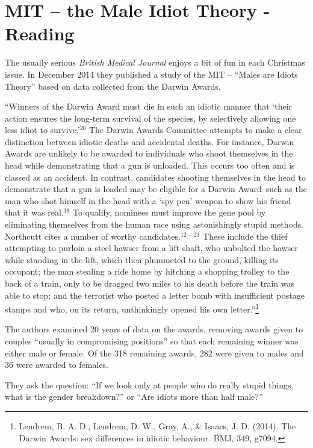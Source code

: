 \def\theTopic{Reading 7}


\section{ MIT -- the Male Idiot Theory - Reading}


The usually  serious {\em British Medical Journal} enjoys a bit
of fun in each Christmas issue.  In December 2014 they
published a study of the MIT -- ``Males are Idiots Theory'' based on
data collected from the Darwin Awards.

``Winners of the Darwin Award must die in such an idiotic
manner that `their action ensures the long-term survival of the
species, by selectively allowing one less idiot to survive.'$^{20}$ The
Darwin Awards Committee attempts to make a clear distinction
between idiotic deaths and accidental deaths. For instance,
Darwin Awards are unlikely to be awarded to individuals who
shoot themselves in the head while demonstrating that a gun is
unloaded. This occurs too often and is classed as an accident.
In contrast, candidates shooting themselves in the head to
demonstrate that a gun is loaded may be eligible for a Darwin
Award--such as the man who shot himself in the head with a
`spy pen' weapon to show his friend that it was real.$^{18}$
To qualify, nominees must improve the gene pool by eliminating
themselves from the human race using astonishingly stupid
methods. Northcutt cites a number of worthy candidates.$^{12-21}$
These include the thief attempting to purloin a steel hawser from
a lift shaft, who unbolted the hawser while standing in the lift,
which then plummeted to the ground, killing its occupant; the
man stealing a ride home by hitching a shopping trolley to the
back of a train, only to be dragged two miles to his death before
the train was able to stop; and the terrorist who posted a letter
bomb with insufficient postage stamps and who, on its return,
unthinkingly opened his own letter.''\footnote{Lendrem, B. A. D.,
  Lendrem, D. W., Gray, A., \& Isaacs, J. D. (2014). The Darwin
  Awards: sex differences in idiotic behaviour. BMJ, 349, g7094.} 

The authors examined 20 years of data on the awards, removing awards
given to couples ``usually in compromising positions'' so that each
remaining winner was either male or female. Of the 318 remaining
awards, 282 were given to males and 36 were awarded to females.

They ask the question: ``If we look only at  people who do really
stupid things, what is the gender breakdown?''  or ``Are idiots more
than half male?''

